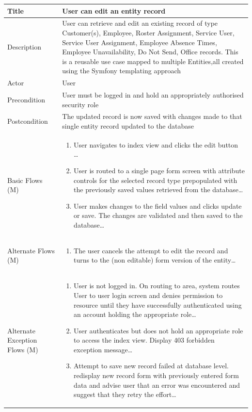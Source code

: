 \documentclass[a4paper,12pt]{article}
\newcommand\addrow[2]{#1 &#2\\ }
\newcommand\addheading[2]{#1 &#2\\ \hline}
\newcommand\tabularhead{\begin{tabular}{lp{8cm}}
\hline
}
\newcommand\addmulrow[2]{ \begin{minipage}[t][][t]{2.5cm}#1\end{minipage}%
   &\begin{minipage}[t][][t]{8cm}
    \begin{enumerate} #2   \end{enumerate}
    \end{minipage}\\ }
\newenvironment{usecase}{\tabularhead}
{\hline\end{tabular}}
\begin{document}
\begin{samepage}
\begin{usecase}
    \addheading{Title}{User can edit an entity record }
  \addheading{Description}{User can retrieve and edit an existing record of type Customer(s), Employee, Roster Assignment, Service User, Service User Assignment, Employee Absence Times, Employee Unavailability, Do Not Send, Office records. This is a reusable use case mapped to multiple Entities,all created using the Symfony templating approach}
  \addheading{Actor}{User} 
  \addrow{Precondition}{User must be logged in and hold an appropriately authorised security role}
  \addrow{Postcondition}{The updated record is now saved with changes made to that single entity record updated to the database}
  \addmulrow{Basic Flows (M)}{\item User navigates to index view and clicks the edit button \ldots
                                  \item User is routed to a single page form screen with attribute controls for the selected record type prepopulated with the previously saved values retrieved from the database\ldots
                                  \item User makes changes to the field values and clicks update or save. The changes are validated and then saved to the database\ldots}
  \addmulrow{Alternate  Flows (M)}{\item The user cancels the attempt to edit the record and turns to the (non editable) form version of the entity\ldots}
  \addmulrow{Alternate Exception Flows (M)}{\item User is not logged in. On routing to area, system routes User to user login screen and denies permission to resource until they have successfully authenticated using an account holding the appropriate role\ldots
                                                                      \item User authenticates but does not hold an appropriate role to access the index view. Display 403 forbidden exception message\ldots
                                                                      \item Attempt to save new record failed at database level. redisplay new record form with previously entered form data and advise user that an error was encountered and suggest that they retry the effort\ldots}

\end{usecase}


\end{samepage}
\end{document}
